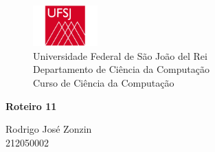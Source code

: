 \begin{figure}[t]
	\centering
	\includegraphics[width=2.5cm]{ufsj}\\
	
	{\large Universidade Federal de São João del Rei\\
		Departamento de Ciência da Computação\\
		Curso de Ciência da Computação\\}
	\label{fig:ufsj}
\end{figure}
{\Large
	\begin{center}
		\textbf{Roteiro 11}
		
	\end{center}
}

{\large 
	
	\begin{center}
		Rodrigo José Zonzin \\
		212050002
	\end{center}	
}

